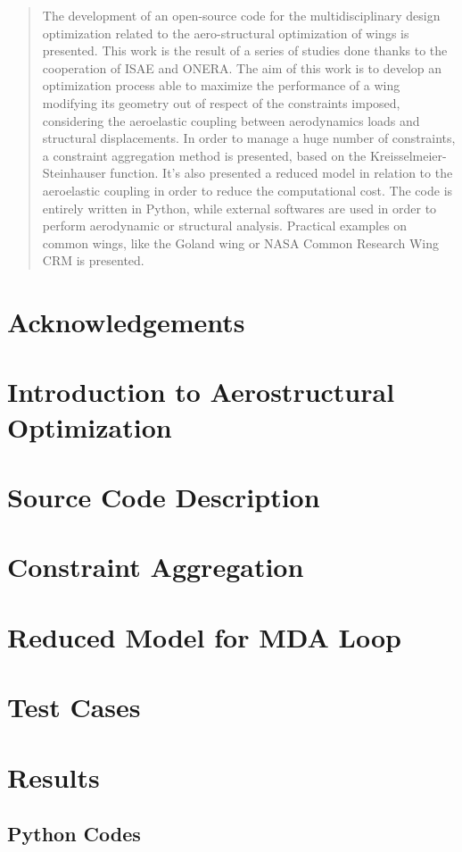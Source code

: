 \documentclass[12pt,english,cucitura,oneside]{toptesi}
\begin{document}
\begin{abstract}
The development of an open-source code for the multidisciplinary design optimization related to the aero-structural optimization of wings is presented. This work is the result of a series of studies done thanks to the cooperation of ISAE and ONERA. The aim of this work is to develop an optimization process able to maximize the performance of a wing modifying its geometry out of respect of the constraints imposed, considering the aeroelastic coupling between aerodynamics loads and structural displacements. In order to manage a huge number of constraints, a constraint aggregation method is presented, based on the Kreisselmeier-Steinhauser function. It’s also presented a reduced model in relation to the aeroelastic coupling in order to reduce the computational cost. The code is entirely written in Python, while external softwares are used in order to perform aerodynamic or structural analysis.  Practical examples on common wings, like the Goland wing or NASA Common Research Wing CRM is presented.
\end{abstract}

\tableofcontents
\listoffigures

\mainmatter
\chapter*{Acknowledgements} 
\label{ring}


\chapter{Introduction to Aerostructural Optimization } 
\label{chapter1}


\chapter{Source Code Description} 
\label{chapter2}

%
\chapter{Constraint Aggregation} 
\label{chapter3}

%
\chapter{Reduced Model for MDA Loop} 
\label{chapter4}

%
\chapter{Test Cases} 
\label{chapter5}


\chapter{Results} 
\label{chapter6}

\setcounter{secnumdepth}{2}


\begin{appendices}
	\addappheadtotoc
	\chapter{Python Codes}
	\label{label1}
	
\end{appendices}

\printbibliography
\end{document}
